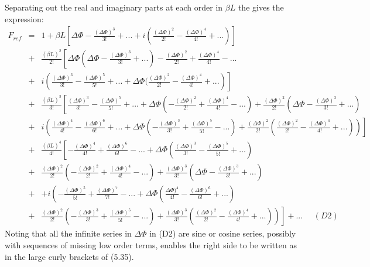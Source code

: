 {   Separating out the real and imaginary parts at each order in  $\beta L$ the gives the expression:
   \begin{eqnarray}
 F_{ref} & = & 1+\beta L \left[\Delta \Phi -\frac{(\Delta \Phi)^3}{3!} +...
         +i\left( \frac{(\Delta \Phi)^2}{2!}-\frac{(\Delta \Phi)^4}{4!} +...\right) \right]
      \nonumber \\
      & + & \frac{(\beta L)^2}{2!} \left[\Delta \Phi( \Delta \Phi-\frac{(\Delta \Phi)^3}{3!}+...)
        -\frac{(\Delta \Phi)^2}{2!}+\frac{(\Delta \Phi)^4}{4!}-...\right. \nonumber \\
      & + & \left. i\left(\frac{(\Delta \Phi)^3}{3!}-\frac{(\Delta \Phi)^5}{5!}+...
           + \Delta \Phi(\frac{(\Delta \Phi)^2}{2!}-\frac{(\Delta \Phi)^4}{4!}+...\right)\right]
       \nonumber \\
      & + &  \frac{(\beta L)^3}{3!} \left[\frac{(\Delta \Phi)^3}{3!}-\frac{(\Delta \Phi)^5}{5!}+...
        +  \Delta \Phi(-\frac{(\Delta \Phi)^2}{2!}+\frac{(\Delta \Phi)^4}{4!}-...)
        + \frac{(\Delta \Phi)^2}{2!}(\Delta \Phi-\frac{(\Delta \Phi)^3}{3!}+...) \right.
       \nonumber \\
     & + & \left.  i\left(\frac{(\Delta \Phi)^4}{4!}-\frac{(\Delta \Phi)^6}{6!}+...
        + \Delta \Phi(-\frac{(\Delta \Phi)^3}{3!}+\frac{(\Delta \Phi)^5}{5!}-...)
        + \frac{(\Delta \Phi)^2}{2!}(\frac{(\Delta \Phi)^2}{2!}-\frac{(\Delta \Phi)^4}{4!}+...)\right)
       \right]   \nonumber \\
      & + &  \frac{(\beta L)^4}{4!}\left[-\frac{(\Delta \Phi)^4}{4!}+\frac{(\Delta \Phi)^6}{6!}-...
            +\Delta \Phi(\frac{(\Delta \Phi)^3}{3!}-\frac{(\Delta \Phi)^5}{5!}+...) \right.
         \nonumber \\
       & + & \frac{(\Delta \Phi)^2}{2!}(-\frac{(\Delta \Phi)^2}{2!}+\frac{(\Delta \Phi)^4}{4!}-...)
           +\frac{( \Delta \Phi)^3}{3!}(\Delta \Phi-\frac{(\Delta \Phi)^3}{3!}+...)    \nonumber \\
       & + & + i\left(-\frac{(\Delta \Phi)^5}{5!}+\frac{(\Delta \Phi)^7}{7!}-...
        + \Delta \Phi(\frac{\Delta \Phi)^4}{4!}-\frac{(\Delta \Phi)^6}{6!}+...) \right.
          \nonumber \\
       & + & \left. \left. \frac{(\Delta \Phi)^2}{2!}(-\frac{(\Delta \Phi)^3}{3!}+\frac{(\Delta \Phi)^5}{5!}-...)
           +\frac{( \Delta \Phi)^3}{3!}(\frac{(\Delta \Phi)^2}{2!}-\frac{(\Delta \Phi)^4}{4!}+...)\right) \right]
         +... \nonumber ~~~~~~(D2)
       \end{eqnarray}     
  Noting that all the infinite series in $\Delta \Phi$ in (D2) are sine or cosine series, possibly with sequences
  of missing low order terms,
  enables the right side to be written as in the large curly brackets of (5.35).

}
